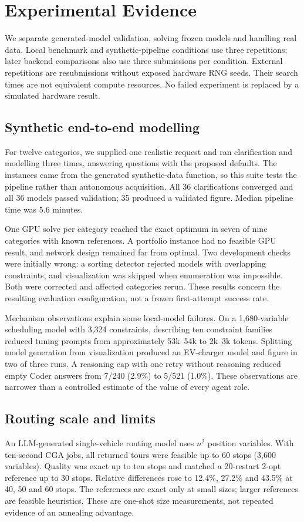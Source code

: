 \section{Experimental Evidence}
\label{sec:experiments}
We separate generated-model validation, solving frozen models and handling real data. Local benchmark and
synthetic-pipeline conditions use three repetitions; later backend comparisons also use three submissions per
condition. External repetitions are resubmissions without exposed hardware RNG seeds. Their search times are
not equivalent compute resources. No failed experiment is replaced by a simulated hardware result.

\subsection{Synthetic end-to-end modelling}
For twelve categories, we supplied one realistic request and ran clarification and modelling three times,
answering questions with the proposed defaults. The instances came from the generated synthetic-data function,
so this suite tests the pipeline rather than autonomous acquisition. All 36 clarifications converged and all
36 models passed validation; 35 produced a validated figure. Median pipeline time was 5.6 minutes.

One GPU solve per category reached the exact optimum in seven of nine categories with known references.
A portfolio instance had no feasible GPU result, and network design remained far from optimal.
Two development checks were initially wrong: a sorting detector rejected models with overlapping constraints,
and visualization was skipped when enumeration was impossible. Both were corrected and affected categories
rerun. These results concern the resulting evaluation configuration, not a frozen first-attempt success rate.

Mechanism observations explain some local-model failures. On a 1,680-variable scheduling model with 3,324
constraints, describing ten constraint families reduced tuning prompts from approximately 53k--54k to 2k--3k
tokens. Splitting model generation from visualization produced an EV-charger model and figure in two of three
runs. A reasoning cap with one retry without reasoning reduced empty Coder answers from 7/240 (2.9\%) to
5/521 (1.0\%). These observations are narrower than a controlled estimate of the value of every agent role.

\subsection{Routing scale and limits}
An LLM-generated single-vehicle routing model uses $n^2$ position variables. With ten-second CGA jobs, all
returned tours were feasible up to 60 stops (3,600 variables). Quality was exact up to ten stops and matched a
20-restart 2-opt reference up to 30 stops. Relative differences rose to 12.4\%, 27.2\% and 43.5\% at 40, 50 and
60 stops. The references are exact only at small sizes; larger references are feasible heuristics.
These are one-shot size measurements, not repeated evidence of an annealing advantage.

